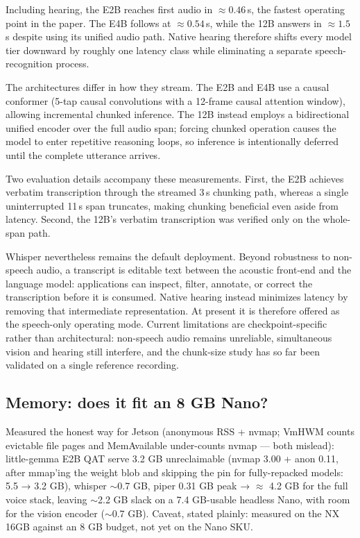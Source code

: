 \documentclass{article}
\begin{document}
Including hearing, the E2B reaches first audio in $\approx0.46$\,s, the
fastest operating point in the paper. The E4B follows at $\approx0.54$\,s,
while the 12B answers in $\approx1.5$\,s despite using its unified audio path.
Native hearing therefore shifts every model tier downward by roughly one
latency class while eliminating a separate speech-recognition process.

The architectures differ in how they stream. The E2B and E4B use a causal
conformer (5-tap causal convolutions with a 12-frame causal attention window),
allowing incremental chunked inference. The 12B instead employs a
bidirectional unified encoder over the full audio span; forcing chunked
operation causes the model to enter repetitive reasoning loops, so inference
is intentionally deferred until the complete utterance arrives.

Two evaluation details accompany these measurements. First, the E2B achieves
verbatim transcription through the streamed 3\,s chunking path, whereas a
single uninterrupted 11\,s span truncates, making chunking beneficial even
aside from latency. Second, the 12B's verbatim transcription was verified only
on the whole-span path.

Whisper nevertheless remains the default deployment. Beyond robustness to
non-speech audio, a transcript is editable text between the acoustic front-end
and the language model: applications can inspect, filter, annotate, or correct
the transcription before it is consumed. Native hearing instead minimizes
latency by removing that intermediate representation. At present it is
therefore offered as the speech-only operating mode. Current limitations are
checkpoint-specific rather than architectural: non-speech audio remains
unreliable, simultaneous vision and hearing still interfere, and the chunk-size
study has so far been validated on a single reference recording.


\subsection{Memory: does it fit an 8 GB Nano?}
\label{sec:memory}

Measured the honest way for Jetson (anonymous RSS + nvmap; VmHWM counts evictable file pages and MemAvailable under-counts nvmap — both mislead): little-gemma E2B QAT serve 3.2 GB unreclaimable (nvmap 3.00 + anon 0.11, after mmap'ing the weight blob and skipping the pin for fully-repacked models: 5.5 → 3.2 GB), whisper $\sim$0.7 GB, piper 0.31 GB peak → $\approx$ 4.2 GB for the full voice stack, leaving $\sim$2.2 GB slack on a 7.4 GB-usable headless Nano, with room for the vision encoder ($\sim$0.7 GB). Caveat, stated plainly: measured on the NX 16GB against an 8 GB budget, not yet on the Nano SKU.
\end{document}
